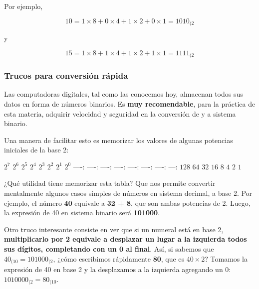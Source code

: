 \documentclass[spanish,a4paper,]{article}
\begin{document}
Por ejemplo,

\[10 = 1\times8 + 0\times4 + 1\times2 + 0\times1 = 1010_{(2}\]

y

\[15 = 1\times8 + 1\times4 + 1\times2 + 1\times1 = 1111_{(2}\]

\hypertarget{trucos-para-conversiuxf3n-ruxe1pida}{%
\subsubsection{Trucos para conversión
rápida}\label{trucos-para-conversiuxf3n-ruxe1pida}}

Las computadoras digitales, tal como las conocemos hoy, almacenan todos
sus datos en forma de números binarios. Es \textbf{muy recomendable},
para la práctica de esta materia, adquirir velocidad y seguridad en la
conversión de y a sistema binario.

Una manera de facilitar esto es memorizar los valores de algunas
potencias iniciales de la base 2:

\(2^7\) \textbar{}\textbar{}\textbar{} \(2^6\)
\textbar{}\textbar{}\textbar{} \(2^5\) \textbar{}\textbar{}\textbar{}
\(2^4\) \textbar{}\textbar{}\textbar{} \(2^3\)
\textbar{}\textbar{}\textbar{} \(2^2\) \textbar{}\textbar{}\textbar{}
\(2^1\) \textbar{}\textbar{}\textbar{} \(2^0\)
----:\textbar{}\textbar{}\textbar{} ----:\textbar{}\textbar{}\textbar{}
----:\textbar{}\textbar{}\textbar{} ----:\textbar{}\textbar{}\textbar{}
----:\textbar{}\textbar{}\textbar{} ----:\textbar{}\textbar{}\textbar{}
----:\textbar{}\textbar{}\textbar{} ---: \(128\)
\textbar{}\textbar{}\textbar{} \(64\) \textbar{}\textbar{}\textbar{}
\(32\) \textbar{}\textbar{}\textbar{} \(16\)
\textbar{}\textbar{}\textbar{} \(8\) \textbar{}\textbar{}\textbar{}
\(4\) \textbar{}\textbar{}\textbar{} \(2\)
\textbar{}\textbar{}\textbar{} \(1\)

¿Qué utilidad tiene memorizar esta tabla? Que nos permite convertir
mentalmente algunos casos simples de números en sistema decimal, a base
2. Por ejemplo, el número \textbf{40} equivale a \textbf{32 + 8}, que
son ambas potencias de 2. Luego, la expresión de 40 en sistema binario
será \textbf{101000}.

Otro truco interesante consiste en ver que si un numeral está en base 2,
\textbf{multiplicarlo por 2 equivale a desplazar un lugar a la izquierda
todos sus dígitos, completando con un 0 al final}. Así, si sabemos que
\(40_{(10} = 101000_{(2}\), ¿cómo escribimos rápidamente \textbf{80},
que es \(40\times2\)? Tomamos la expresión de 40 en base 2 y la
desplazamos a la izquierda agregando un 0: \(1010000_{(2} = 80_{(10}\).
\end{document}
